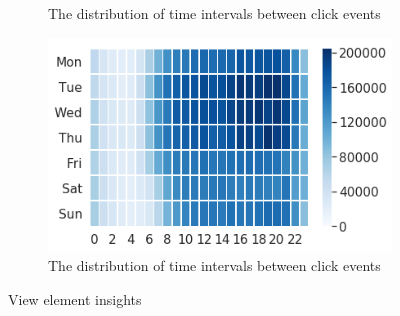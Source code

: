 \begin{figure}[htbp!]
\begin{subfigure}[b]{0.3\textwidth}
    \caption{The distribution of time intervals between click events}
    \label{fig:zhou_event_time_intervals}
  \end{subfigure}
  \hfill
  \begin{subfigure}[b]{0.3\textwidth}
    \centering
    \includegraphics[width=\textwidth]{graphics/zhou_event_time_distribution}
    \caption{The distribution of time intervals between click events}
    \label{fig:zhou_event_time_distribution}
  \end{subfigure}
  \caption{View element insights \cite{zhou2021large}}
  \label{fig:zhou_graphs}
\end{figure}
